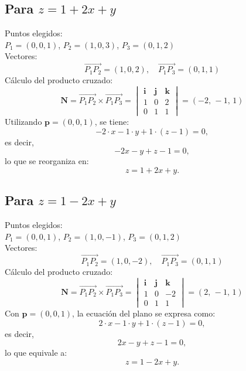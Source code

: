 \documentclass{article}
\begin{document}
\subsection{Para $z = 1 + 2x + y$}
Puntos elegidos: \\ 
$P_1 = (0,0,1)$, $P_2 = (1,0,3)$, $P_3 = (0,1,2)$ \\[1mm]
Vectores:
\begin{equation*}
    \overrightarrow{P_1P_2} = (1,0,2), \quad \overrightarrow{P_1P_3} = (0,1,1)
\end{equation*}
Cálculo del producto cruzado:
\begin{equation*}
    \mathbf{N} = \overrightarrow{P_1P_2} \times \overrightarrow{P_1P_3} =
    \begin{vmatrix} 
    \mathbf{i} & \mathbf{j} & \mathbf{k} \\
    1 & 0 & 2 \\
    0 & 1 & 1
    \end{vmatrix} = (-2,\,-1,\,1)
\end{equation*}
Utilizando \( \mathbf{p} = (0,0,1) \), se tiene:
\[
-2\cdot x - 1\cdot y + 1\cdot (z-1) = 0,
\]
es decir,
\[
-2x - y + z - 1 = 0,
\]
lo que se reorganiza en:
\[
z = 1 + 2x + y.
\]

\subsection{Para $z = 1 - 2x + y$}
Puntos elegidos: \\ 
$P_1 = (0,0,1)$, $P_2 = (1,0,-1)$, $P_3 = (0,1,2)$ \\[1mm]
Vectores:
\begin{equation*}
    \overrightarrow{P_1P_2} = (1,0,-2), \quad \overrightarrow{P_1P_3} = (0,1,1)
\end{equation*}
Cálculo del producto cruzado:
\begin{equation*}
    \mathbf{N} = \overrightarrow{P_1P_2} \times \overrightarrow{P_1P_3} =
    \begin{vmatrix} 
    \mathbf{i} & \mathbf{j} & \mathbf{k} \\
    1 & 0 & -2 \\
    0 & 1 & 1
    \end{vmatrix} = (2,\,-1,\,1)
\end{equation*}
Con \( \mathbf{p} = (0,0,1) \), la ecuación del plano se expresa como:
\[
2\cdot x - 1\cdot y + 1\cdot (z-1) = 0,
\]
es decir,
\[
2x - y + z - 1 = 0,
\]
lo que equivale a:
\[
z = 1 - 2x + y.
\]
\end{document}
